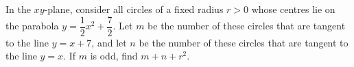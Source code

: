 In the $xy$-plane, consider all circles of a fixed radius $r>0$ whose centres lie on the parabola $y=\dfrac{1}{2}x^2+\dfrac{7}{2}$. Let $m$ be the number of these circles that are tangent to the line $y=x+7$, and let $n$ be the number of these circles that are tangent to the line $y=x$. If $m$ is odd, find $m+n+r^2$.
